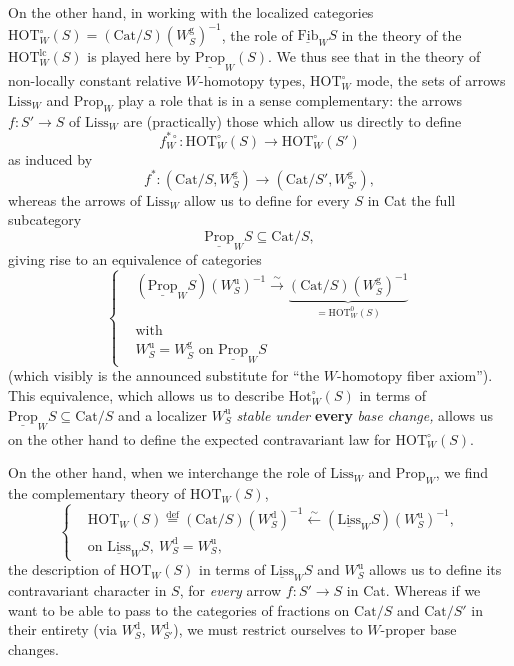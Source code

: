 \documentclass[11pt]{article}
\newcommand{\printedpage}[1]{\marginpar{\footnotesize p.~#1}}
\newcommand{\msp}[1]{\marginpar{\footnotesize [#1]}}
\newcommand{\deff}{\overset{\text{def}}{=}}
\begin{document}
On the other hand, in working with the localized categories $\mathrm{HOT}^\circ_W(S) = (\mathrm{Cat}/S)(W^{\mathrm{g}}_S)^{-1}$, the role of $\underline{\mathrm{Fib}}_W S$ in the theory of the $\mathrm{HOT}^{\mathrm{lc}}_W(S)$ is played here by $\underline{\mathrm{Prop}}_W(S)$. We thus see that in the theory of non-locally constant relative $W$-homotopy types, $\mathrm{HOT}^\circ_W$ mode, the sets of arrows $\mathrm{Liss}_W$ and $\mathrm{Prop}_W$ play a role that is in a sense complementary: the arrows $f : S' \longrightarrow S$ of $\mathrm{Liss}_W$ are (practically) those which allow us directly to define
\[
f^{*\circ}_W : \mathrm{HOT}^\circ_W(S) \longrightarrow \mathrm{HOT}^\circ_W(S')
\]
as induced by
\[
f^* : (\mathrm{Cat}/S, W^{\mathrm{g}}_S) \longrightarrow (\mathrm{Cat}/S', W^{\mathrm{g}}_{S'}),
\]
whereas the arrows of $\mathrm{Liss}_W$ allow us to define for every $S$ in Cat the full subcategory
\[
\underline{\mathrm{Prop}}_W S \subseteq \mathrm{Cat}/S,
\]
giving rise to an equivalence of categories
\[
\left\{
\begin{aligned}
&(\underline{\mathrm{Prop}}_W S)(W^{\mathrm{u}}_S)^{-1} \xrightarrow{\sim} \underbrace{(\mathrm{Cat}/S)(W^{\mathrm{g}}_S)^{-1}}_{= \mathrm{HOT}^0_W(S)} %
\\
&\text{with}\\
&W^{\mathrm{u}}_S = W^{\mathrm{g}}_S \text{ on } \underline{\mathrm{Prop}}_W S
\end{aligned}
\right.
\]
(which visibly is the announced substitute for ``the $W$-homotopy fiber axiom''). This
\msp{page 224}
equivalence, which allows us to describe $\mathrm{Hot}^\circ_W(S)$ in terms of $\underline{\mathrm{Prop}}_W S \subseteq \mathrm{Cat}/S$ and a localizer $W^{\mathrm{u}}_S$ \textit{stable under} \textbf{every} \textit{base change,} allows us on the other hand to define the expected contravariant law for $\mathrm{HOT}^\circ_W(S)$.

\printedpage{143}

On the other hand, when we interchange the role of $\mathrm{Liss}_W$ and $\mathrm{Prop}_W$, we find the complementary theory of $\mathrm{HOT}_W(S)$,
\[
\left\{
\begin{aligned}
&\mathrm{HOT}_W(S) \deff (\mathrm{Cat}/S)(W^{\mathrm{d}}_S)^{-1} \xleftarrow{\sim} (\underline{\mathrm{Liss}}_W S)(W^{\mathrm{u}}_S)^{-1},\\
&\text{on } \underline{\mathrm{Liss}}_W S,\ W^{\mathrm{d}}_S = W^{\mathrm{u}}_S,
\end{aligned}
\right.
\]
the description of $\mathrm{HOT}_W(S)$ in terms of $\underline{\mathrm{Liss}}_W S$ and $W^{\mathrm{u}}_S$ allows us to define its contravariant character in $S$, for \textit{every} arrow $f : S' \longrightarrow S$ in Cat. Whereas if we want to be able to pass to the categories of fractions on $\mathrm{Cat}/S$ and $\mathrm{Cat}/S'$ in their entirety (via $W^{\mathrm{d}}_S$, $W^{\mathrm{d}}_{S'}$), we must restrict ourselves to $W$-proper base changes.
\end{document}
